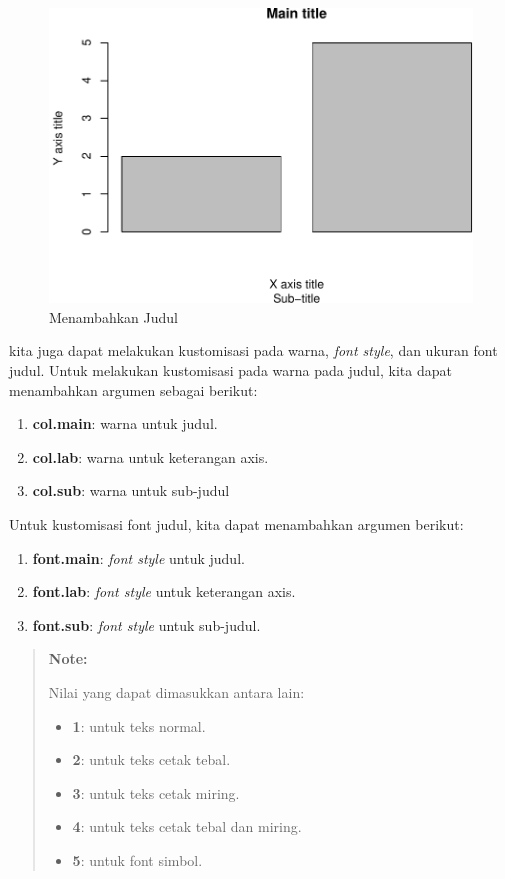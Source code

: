 \documentclass[]{book}
\providecommand{\tightlist}{%
  \setlength{\itemsep}{0pt}\setlength{\parskip}{0pt}}
\begin{document}
\begin{figure}

{\centering \includegraphics[width=0.7\linewidth]{EnvStat_files/figure-latex/title-1} 

}

\caption{Menambahkan Judul}\label{fig:title}
\end{figure}

kita juga dapat melakukan kustomisasi pada warna, \emph{font style}, dan
ukuran font judul. Untuk melakukan kustomisasi pada warna pada judul,
kita dapat menambahkan argumen sebagai berikut:

\begin{enumerate}
\def\labelenumi{\alph{enumi}.}
\tightlist
\item
  \textbf{col.main}: warna untuk judul.
\item
  \textbf{col.lab}: warna untuk keterangan axis.
\item
  \textbf{col.sub}: warna untuk sub-judul
\end{enumerate}

Untuk kustomisasi font judul, kita dapat menambahkan argumen berikut:

\begin{enumerate}
\def\labelenumi{\alph{enumi}.}
\tightlist
\item
  \textbf{font.main}: \emph{font style} untuk judul.
\item
  \textbf{font.lab}: \emph{font style} untuk keterangan axis.
\item
  \textbf{font.sub}: \emph{font style} untuk sub-judul.
\end{enumerate}

\begin{quote}
\textbf{Note: }

Nilai yang dapat dimasukkan antara lain:

\begin{itemize}
\tightlist
\item
  \textbf{1}: untuk teks normal.
\item
  \textbf{2}: untuk teks cetak tebal.
\item
  \textbf{3}: untuk teks cetak miring.
\item
  \textbf{4}: untuk teks cetak tebal dan miring.
\item
  \textbf{5}: untuk font simbol.
\end{itemize}
\end{quote}
\end{document}
